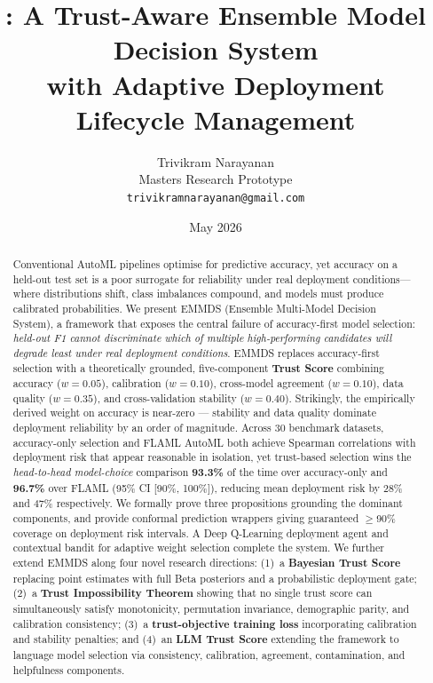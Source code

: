 \documentclass[10pt]{article}
\title{\textbf{\EMMDS}: A Trust-Aware Ensemble Model Decision System\\
       with Adaptive Deployment Lifecycle Management}
\author{
  Trivikram Narayanan\\
  Masters Research Prototype\\
  \texttt{trivikramnarayanan@gmail.com}
}
\date{May 2026}
\newcommand{\EMMDS}{\textsc{EMMDS}}
\begin{document}
\maketitle

\begin{abstract}
Conventional AutoML pipelines optimise for predictive accuracy, yet accuracy on a held-out test set is a poor surrogate for reliability under real deployment conditions—where distributions shift, class imbalances compound, and models must produce calibrated probabilities. We present \EMMDS{} (Ensemble Multi-Model Decision System), a framework that exposes the central failure of accuracy-first model selection: \emph{held-out F1 cannot discriminate which of multiple high-performing candidates will degrade least under real deployment conditions}. EMMDS replaces accuracy-first selection with a theoretically grounded, five-component \textbf{Trust Score} combining accuracy ($w{=}0.05$), calibration ($w{=}0.10$), cross-model agreement ($w{=}0.10$), data quality ($w{=}0.35$), and cross-validation stability ($w{=}0.40$). Strikingly, the empirically derived weight on accuracy is near-zero — stability and data quality dominate deployment reliability by an order of magnitude. Across 30 benchmark datasets, accuracy-only selection and FLAML AutoML both achieve Spearman correlations with deployment risk that appear reasonable in isolation, yet trust-based selection wins the \emph{head-to-head model-choice} comparison \textbf{93.3\%} of the time over accuracy-only and \textbf{96.7\%} over FLAML (95\% CI [90\%, 100\%]), reducing mean deployment risk by 28\% and 47\% respectively. We formally prove three propositions grounding the dominant components, and provide conformal prediction wrappers giving guaranteed $\geq$90\% coverage on deployment risk intervals. A Deep Q-Learning deployment agent and contextual bandit for adaptive weight selection complete the system. We further extend EMMDS along four novel research directions: (1)~a \textbf{Bayesian Trust Score} replacing point estimates with full Beta posteriors and a probabilistic deployment gate; (2)~a \textbf{Trust Impossibility Theorem} showing that no single trust score can simultaneously satisfy monotonicity, permutation invariance, demographic parity, and calibration consistency; (3)~a \textbf{trust-objective training loss} incorporating calibration and stability penalties; and (4)~an \textbf{LLM Trust Score} extending the framework to language model selection via consistency, calibration, agreement, contamination, and helpfulness components.


\end{abstract}
\end{document}

